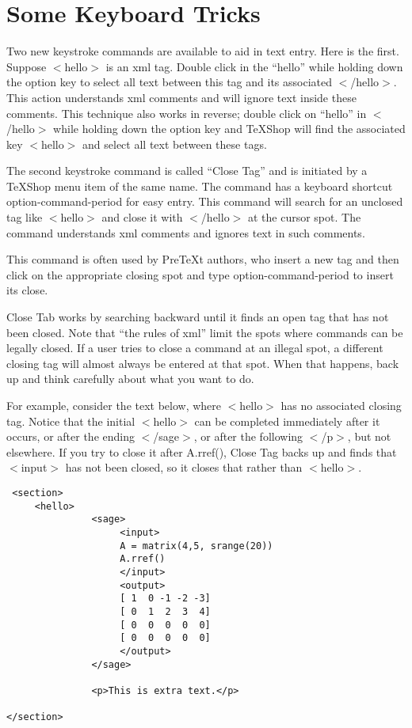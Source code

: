 \documentclass[11pt, oneside]{article}   	%
\begin{document}
\section{Some Keyboard Tricks}

Two new keystroke commands are available to aid in text entry. Here is the first. Suppose $<$hello$>$ is an xml tag. Double click in the ``hello'' while holding down the option key to select all text between this tag and its associated $<$/hello$>$. This action understands xml comments and will ignore text inside these comments. This technique also works in reverse; double click on ``hello'' in $<$/hello$>$ while holding down the option key and TeXShop will find the associated key $<$hello$>$ and select all text between these tags. 

 
 The second keystroke command is called ``Close Tag'' and is initiated by a TeXShop menu item of the same name. The command has a keyboard shortcut option-command-period for easy entry. This command will search for an unclosed tag like $<$hello$>$ and close it with $<$/hello$>$ at the cursor spot. The command understands xml comments and ignores text in such comments. 
 
This command is often used by PreTeXt authors, who insert a new tag and then click on the appropriate closing spot and type option-command-period to insert its close. 

Close Tab works by searching backward until it finds an open tag that has not been closed. Note that ``the rules of xml'' limit the spots where commands can be legally closed. If a user tries to close a command at an illegal spot, a different closing tag will almost always be entered at that spot. When that happens, back up and think carefully about what you want to do.

 For example, consider the text below, where $<$hello$>$ has no associated closing tag.
 Notice that the initial $<$hello$>$ can be completed immediately after it occurs, or after the ending $<$/sage$>$, or after the following $<$/p$>$, but not elsewhere. If you try to close it after A.rref(), Close Tag backs up and finds that $<$input$>$ has not been closed, so it closes that rather than $<$hello$>$.
  

 \begin{verbatim}
 <section>
     <hello>
               <sage>
                    <input>
                    A = matrix(4,5, srange(20))
                    A.rref()
                    </input>
                    <output>
                    [ 1  0 -1 -2 -3]
                    [ 0  1  2  3  4]
                    [ 0  0  0  0  0]
                    [ 0  0  0  0  0]
                    </output>
               </sage>
            
               <p>This is extra text.</p>
            
</section>
\end{verbatim}
\end{document}
